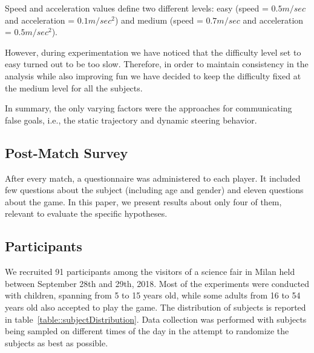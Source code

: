 Speed and acceleration values define two different levels: easy (speed = $0.5m/sec$ and acceleration = $0.1m/sec^2$) and medium (speed = $0.7m/sec$ and acceleration = $0.5m/sec^2$).

However, during experimentation we have noticed that the difficulty level set to easy turned out to be too slow. Therefore, in order to maintain consistency in the analysis while also improving fun we have decided to keep the difficulty fixed at the medium level for all the subjects.

In summary, the only varying factors were the approaches for communicating false goals, i.e., the static trajectory and dynamic steering behavior.

\subsection{Post-Match Survey}

After every match, a questionnaire was administered to each player. It included few questions about the subject (including age and gender) and eleven questions about the game. In this paper, we present results about only four of them, relevant to evaluate the specific hypotheses.

\subsection{Participants}
We recruited 91 participants among the visitors of a science fair in Milan held between September 28th and 29th, 2018. Most of the experiments were conducted with children, spanning from 5 to 15 years old, while some adults from 16 to 54 years old also accepted to play the game. The distribution of subjects is reported in table~\ref{table::subjectDistribution}. Data collection was performed with subjects being sampled on different times of the day in the attempt to randomize the subjects as best as possible. 

